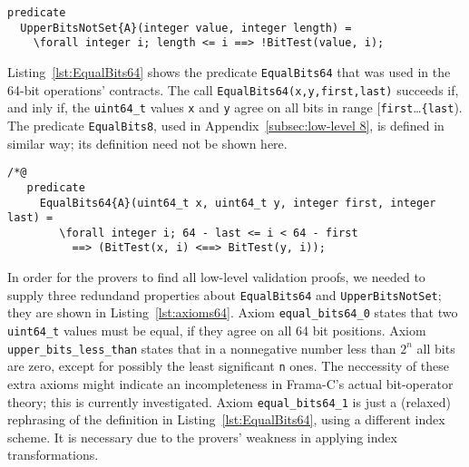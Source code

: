 \begin{listing}[hbt]
\begin{minipage}{0.99\textwidth}
\begin{lstlisting}[style=acsl-block]
predicate
  UpperBitsNotSet{A}(integer value, integer length) =
    \forall integer i; length <= i ==> !BitTest(value, i);
\end{lstlisting}
\end{minipage}
\caption{\label{lst:UpperBitsNotSet integer}
	Definition of the low-level predicate \lstinline{UpperBitsNotSet}}
\end{listing}


Listing~\ref{lst:EqualBits64} shows the predicate
\lstinline{EqualBits64} that was used in the 64-bit
operations' contracts.
%
The call \lstinline{EqualBits64(x,y,first,last)} succeeds if, and inly
if, the \lstinline{uint64_t} values  \lstinline{x} and  \lstinline{y}
agree on all bits in range [\lstinline{first}\ldots\lstinline{{last}).
%
The predicate \lstinline{EqualBits8}, used in
Appendix~\ref{subsec:low-level 8}, is defined in similar way; its
definition need not be shown here.










\begin{listing}[hbt]
\begin{minipage}{0.99\textwidth}
\begin{lstlisting}[style=acsl-block]
/*@
   predicate
     EqualBits64{A}(uint64_t x, uint64_t y, integer first, integer last) =
        \forall integer i; 64 - last <= i < 64 - first 
          ==> (BitTest(x, i) <==> BitTest(y, i));
\end{lstlisting}
\end{minipage}
\caption{\label{lst:EqualBits64}
        Definition of the low-level predicate \lstinline{EqualBits64}}
\end{listing}








In order for the provers to find all low-level validation proofs, we
needed to supply three redundand properties about
\lstinline{EqualBits64} and \lstinline{UpperBitsNotSet}; they are shown
in Listing~\ref{lst:axioms64}.
%
Axiom \lstinline{equal_bits64_0} states that two \lstinline{uint64_t}
values must be equal, if they agree on all 64 bit positions.
%
Axiom \lstinline{upper_bits_less_than} states that in a nonnegative number
less than $2^n$ all bits are zero, except for possibly
the least significant \lstinline{n} ones.
%
The neccessity of these extra axioms might indicate an
incompleteness in Frama-C's actual bit-operator theory; this is currently
investigated.
%
Axiom \lstinline{equal_bits64_1} is just a (relaxed)
rephrasing of the definition
in Listing~\ref{lst:EqualBits64}, using a different index scheme.
%
It is necessary due to the provers' weakness in applying index
transformations.










